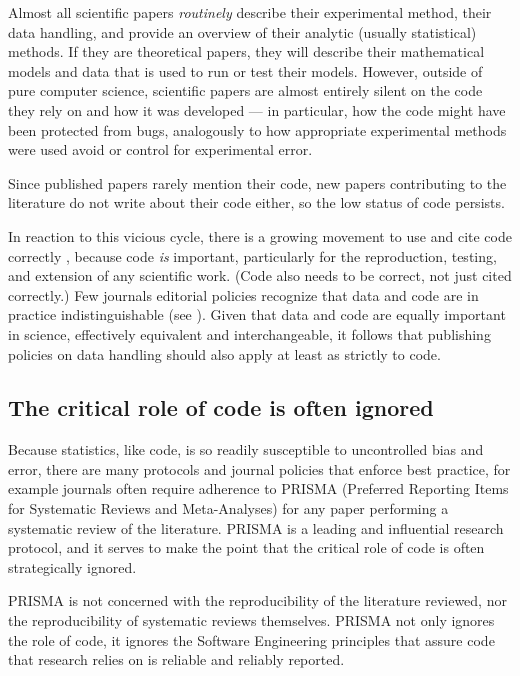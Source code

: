 \documentclass{comjnl}
\begin{document}
Almost all scientific papers \emph{routinely\/} describe their experimental method, their data handling, and provide an overview of their analytic (usually statistical) methods. If they are theoretical papers, they will describe their mathematical models and data that is used to run or test their models. However, outside of pure computer science, scientific papers are almost entirely silent on the code they rely on and how it was developed --- in particular, how the code might have been protected from bugs, analogously to how appropriate experimental methods were used avoid or control for experimental error. 

Since published papers rarely mention their code, new papers contributing to the literature do not write about their code either, so the low status of code persists. 

In reaction to this vicious cycle, there is a growing movement to use and cite code correctly \cite{cite-code,TOP}, because code \emph{is\/} important, particularly for the reproduction, testing, and extension of any scientific work. (Code also needs to be correct, not just cited correctly.) Few journals editorial policies recognize that data and code are in practice indistinguishable (see \supplement). Given that data and code are equally important in science, effectively equivalent and interchangeable, it follows that publishing policies on data handling should also apply at least as strictly to code.

\subsection{The critical role of code is often ignored}\label{central-role-of-code}\label{PRISMA-statement}
Because statistics, like code, is so readily susceptible to uncontrolled bias and error, there are many protocols and journal policies that enforce best practice, for example journals often require adherence to PRISMA (Preferred Reporting Items for Systematic Reviews and Meta-Analyses) \cite{prisma} for any paper performing a systematic review of the literature. PRISMA is a leading and influential research protocol, and it serves to make the point that the critical role of code is often strategically ignored. 

PRISMA is not concerned with the reproducibility of the literature reviewed, nor the reproducibility of systematic reviews themselves. PRISMA not only ignores the role of code, it ignores the Software Engineering principles that assure code that research relies on is reliable and reliably reported. 
\end{document}
